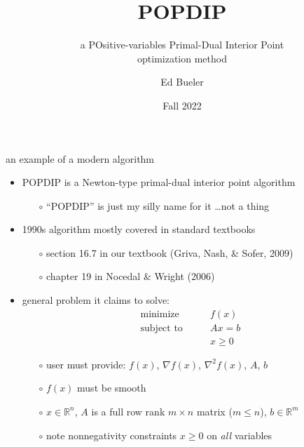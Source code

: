 \documentclass[10pt,hyperref,dvipsnames]{beamer}
\title{POPDIP}
\subtitle{a POsitive-variables Primal-Dual Interior Point \\ optimization method}
\author{Ed Bueler}
\institute[MATH 661]{MATH 661 Optimization}
\date{Fall 2022}
\newcommand{\grad}{\nabla}
\newcommand{\RR}{\mathbb{R}}
\begin{document}
\beamertemplatenavigationsymbolsempty

\begin{frame}
  \maketitle
\end{frame}


\begin{frame}{an example of a modern algorithm}

\begin{itemize}
\item POPDIP is a Newton-type primal-dual interior point algorithm
    \begin{itemize}
    \item[$\circ$] ``POPDIP'' is just my silly name for it \dots not a thing
    \end{itemize}
\item 1990s algorithm mostly covered in standard textbooks
    \begin{itemize}
    \item[$\circ$] section 16.7 in our textbook (Griva, Nash, \& Sofer, 2009)
    \item[$\circ$] chapter 19 in Nocedal \& Wright (2006)
    \end{itemize}

\bigskip
\item general problem it claims to solve:
\begin{equation*}
\begin{matrix}
\text{minimize} \qquad   & f(x) \\
\text{subject to} \qquad & A x = b \\
                         & x \ge 0
\end{matrix}
\end{equation*}

    \begin{itemize}
    \item[$\circ$] user must provide: $f(x)$, $\grad f(x)$, $\grad^2 f(x)$, $A$, $b$
    \item[$\circ$] $f(x)$ must be smooth
    \item[$\circ$] $x\in \RR^n$, $A$ is a full row rank $m\times n$ matrix ($m\le n$), $b\in\RR^m$
    \item[$\circ$] note nonnegativity constraints $x\ge 0$ on \emph{all} variables
    \end{itemize}
\end{itemize}
\end{frame}
\end{document}
